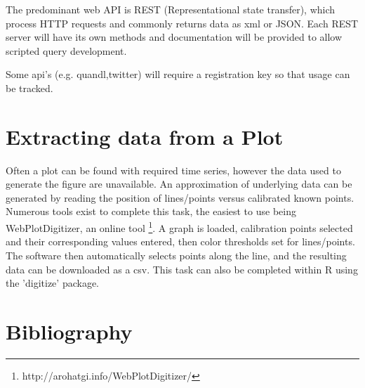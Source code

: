 \documentclass[11pt]{article}
\begin{document}
	The predominant web API is REST (Representational state transfer), which process HTTP requests and commonly returns data as xml or JSON.
	Each REST server will have its own methods and documentation will be provided to allow scripted query development.


	Some api's (e.g. quandl,twitter) will require a registration key so that usage can be tracked.

	\section{Extracting data from a Plot}\label{graph}
	Often a plot can be found with required time series, however the data used to generate the figure are unavailable.
	An approximation of underlying data can be generated by reading the position of lines/points versus calibrated known points. 
	Numerous tools exist to complete this task, the easiest to use being WebPlotDigitizer, an online tool \footnote{http://arohatgi.info/WebPlotDigitizer/}. 
	A graph is loaded, calibration points selected and their corresponding values entered, then color thresholds set for lines/points.
	The software then automatically selects points along the line, and the resulting data can be downloaded as a csv.
	This task can also be completed within R using the 'digitize' package.

\newpage
\section{Bibliography}


\end{document}
